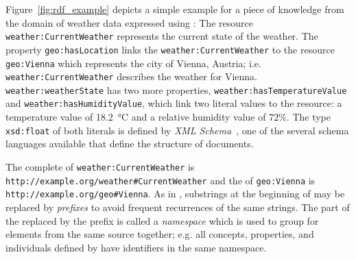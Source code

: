 Figure~\ref{fig:rdf_example} depicts a simple example for a piece of knowledge from the domain of weather data expressed using : The resource \texttt{weather:\hspace{0pt}Current\hspace{0pt}Weather} represents the current state of the weather. The property \texttt{geo:\hspace{0pt}has\hspace{0pt}Location} links the \texttt{weather:\hspace{0pt}Current\hspace{0pt}Weather} to the resource \texttt{geo:\hspace{0pt}Vienna} which represents the city of Vienna, Austria; i.e. \texttt{weather:\hspace{0pt}Current\hspace{0pt}Weather} describes the weather for Vienna. \texttt{weather:\hspace{0pt}weather\hspace{0pt}State} has two more properties, \texttt{weather:\hspace{0pt}has\hspace{0pt}Temperature\hspace{0pt}Value} and \texttt{weather:\hspace{0pt}has\hspace{0pt}Humidity\hspace{0pt}Value}, which link two literal values to the resource: a temperature value of \SI{18.2}{\celsius} and a relative humidity value of $72 \%$.
The type \texttt{xsd:\hspace{0pt}float} of both literals is defined by \emph{XML Schema}~\cite{xml-schema,xml-schema-datatypes}, one of the several  schema languages available that define the structure of  documents.

The complete  of \texttt{weather:\hspace{0pt}Current\hspace{0pt}Weather} is \texttt{http://example.org/\hspace{0pt}weather\#\hspace{0pt}CurrentWeather} and the  of \texttt{geo:\hspace{0pt}Vienna} is \texttt{http://example.org/geo\#Vienna}. As in , substrings at the beginning of  may be replaced by \emph{prefixes} to avoid frequent recurrences of the same strings. The part of the  replaced by the prefix is called a \emph{namespace} which is used to group  for elements from the same source together; e.g. all concepts, properties, and individuals defined by \smarthomeweather have identifiers in the same namespace.

